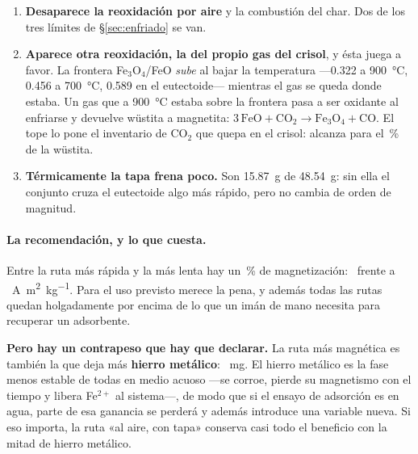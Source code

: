 \documentclass[11pt,a4paper]{article}
\newcommand{\ojo}[1]{\textcolor{aviso}{\textbf{#1}}}
\begin{document}
\begin{enumerate}[leftmargin=*,itemsep=2pt]
\item \textbf{Desaparece la reoxidación por aire} y la combustión del char. Dos
de los tres límites de \S\ref{sec:enfriado} se van.
\item \textbf{Aparece otra reoxidación, la del propio gas del crisol}, y ésta
juega a favor. La frontera Fe$_3$O$_4$/FeO \emph{sube} al bajar la temperatura
---\num{0.322} a \SI{900}{\celsius}, \num{0.456} a \SI{700}{\celsius},
\num{0.589} en el eutectoide--- mientras el gas se queda donde estaba. Un gas
que a \SI{900}{\celsius} estaba sobre la frontera pasa a ser oxidante al
enfriarse y devuelve wüstita a magnetita:
$3\,\mathrm{FeO} + \mathrm{CO_2} \rightarrow \mathrm{Fe_3O_4} + \mathrm{CO}$.
El tope lo pone el inventario de CO$_2$ que quepa en el crisol: alcanza para el
\datReoxidaGas\,\% de la wüstita.
\item \textbf{Térmicamente la tapa frena poco.} Son \qty{15.87}{\gram} de
\qty{48.54}{\gram}: sin ella el conjunto cruza el eutectoide algo más rápido,
pero no cambia de orden de magnitud.
\end{enumerate}

\begin{table}[H]
\centering\small

\caption{Las cuatro rutas de enfriado, ordenadas por lo magnético que dejan el
producto. «Ventana» es el tiempo dentro de 570--\SI{400}{\celsius}, donde el
eutectoide puede operar; «eutect.» es la fracción de wüstita que alcanza a
descomponerse. La última columna es la magnetización relativa a la ruta más
rápida.}
\label{tab:rutas}
\end{table}

\paragraph{La recomendación, y lo que cuesta.} Entre la ruta más rápida y la más
lenta hay un \datMagnetGananciaRuta\,\% de magnetización:
\datMagnetPeorRuta\ frente a \datMagnetMejorRuta\
\si{\ampere\meter\squared\per\kilo\gram}. Para el uso previsto merece la pena, y
además todas las rutas quedan holgadamente por encima de lo que un imán de mano
necesita para recuperar un adsorbente.

\ojo{Pero hay un contrapeso que hay que declarar.} La ruta más magnética es
también la que deja más \textbf{hierro metálico}: \datFeMetalMejorRuta\
\si{\milli\gram}. El hierro metálico es la fase menos estable de todas en medio
acuoso ---se corroe, pierde su magnetismo con el tiempo y libera Fe$^{2+}$ al
sistema---, de modo que si el ensayo de adsorción es en agua, parte de esa
ganancia se perderá y además introduce una variable nueva. Si eso importa, la
ruta «al aire, con tapa» conserva casi todo el beneficio con la mitad de hierro
metálico.
\end{document}
